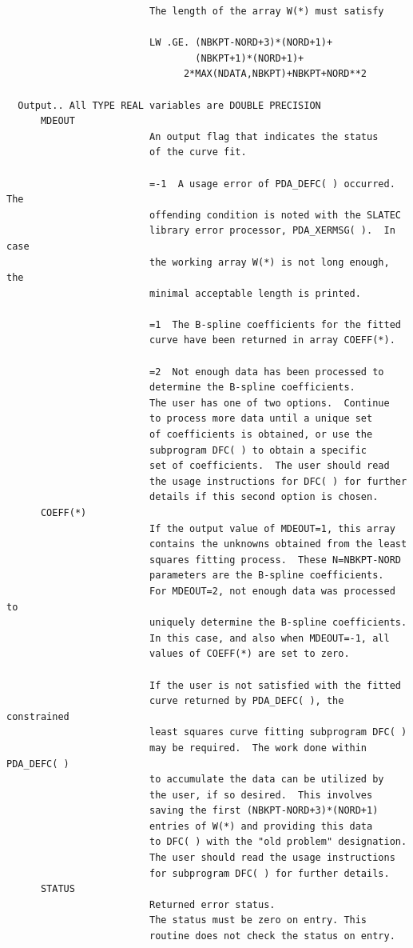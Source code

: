 \documentclass[11pt,twoside]{article}
\begin{document}
\begin{verbatim}
                         The length of the array W(*) must satisfy

                         LW .GE. (NBKPT-NORD+3)*(NORD+1)+
                                 (NBKPT+1)*(NORD+1)+
                               2*MAX(NDATA,NBKPT)+NBKPT+NORD**2

  Output.. All TYPE REAL variables are DOUBLE PRECISION
      MDEOUT
                         An output flag that indicates the status
                         of the curve fit.

                         =-1  A usage error of PDA_DEFC( ) occurred.  The
                         offending condition is noted with the SLATEC
                         library error processor, PDA_XERMSG( ).  In case
                         the working array W(*) is not long enough, the
                         minimal acceptable length is printed.

                         =1  The B-spline coefficients for the fitted
                         curve have been returned in array COEFF(*).

                         =2  Not enough data has been processed to
                         determine the B-spline coefficients.
                         The user has one of two options.  Continue
                         to process more data until a unique set
                         of coefficients is obtained, or use the
                         subprogram DFC( ) to obtain a specific
                         set of coefficients.  The user should read
                         the usage instructions for DFC( ) for further
                         details if this second option is chosen.
      COEFF(*)
                         If the output value of MDEOUT=1, this array
                         contains the unknowns obtained from the least
                         squares fitting process.  These N=NBKPT-NORD
                         parameters are the B-spline coefficients.
                         For MDEOUT=2, not enough data was processed to
                         uniquely determine the B-spline coefficients.
                         In this case, and also when MDEOUT=-1, all
                         values of COEFF(*) are set to zero.

                         If the user is not satisfied with the fitted
                         curve returned by PDA_DEFC( ), the constrained
                         least squares curve fitting subprogram DFC( )
                         may be required.  The work done within PDA_DEFC( )
                         to accumulate the data can be utilized by
                         the user, if so desired.  This involves
                         saving the first (NBKPT-NORD+3)*(NORD+1)
                         entries of W(*) and providing this data
                         to DFC( ) with the "old problem" designation.
                         The user should read the usage instructions
                         for subprogram DFC( ) for further details.
      STATUS
                         Returned error status.
                         The status must be zero on entry. This
                         routine does not check the status on entry.


\end{verbatim}
\end{document}

